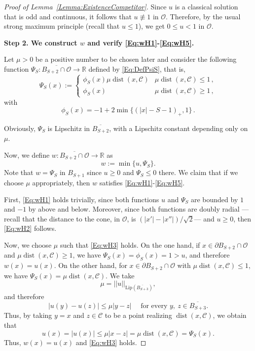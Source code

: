 \documentclass[12pt,reqno]{amsart}
\theoremstyle{definition}
\theoremstyle{remark}
\newcommand{\con}[1]{\mathbb{#1}}
\newcommand{\R}{\con{R}} %
\newcommand{\ccal}{\mathscr{C}}
\newcommand{\ocal}{\mathcal{O}}
\newcommand{\norm}[1]{\left | \left |{#1} \right | \right |}
\DeclareMathOperator{\dist}{dist}
\numberwithin{equation}{section}
\begin{document}
\begin{proof}[Proof of Lemma~\ref{Lemma:ExistenceCompetitor}]
	Since $u$ is a classical solution that is odd and continuous, it follows that $u \not \equiv 1$ in $\ocal$. Therefore, by the usual strong maximum principle (recall that $u\leq 1$), we get $0\leq u < 1$ in $\ocal$. 
	
	\medskip
	
	\textbf{Step 2. We construct $w$ and verify \eqref{Eq:wH1}-\eqref{Eq:wH5}.} 
	
	Let $\mu>0$ be a positive number to be chosen later and consider the following function $\Psi_S:\overline{B_{S+2} \cap \ocal} \to \R$ defined by \eqref{Eq:DefPsiS}, that is, 
	$$
	\Psi_S(x) :=
	\begin{cases}
	\phi_S (x) \mu\dist(x,\ccal) &  \mu\dist(x,\ccal) \leq 1 \,, \\
	\phi_S (x) &  \mu\dist(x,\ccal) \geq 1\,,
	\end{cases}
	$$
	with 
	$$
	\phi_S (x) =-1+2\min\{(|x|-S-1)_+,1\}\,.
	$$
	
	Obviously, $\Psi_S$ is Lipschitz in $\overline{B_{S+2}}$, with a Lipschitz constant depending only on $\mu$.
	
	Now, we define $w:\overline{B_{S+2} \cap \ocal} \to \R$ as
	$$
	w:= \min \{u, \Psi_S\}.
	$$
	Note that $w=\Psi_S$ in $B_{S+1}$ since $u\geq 0$ and $\Psi_S\leq 0$ there.	We claim that if we choose $\mu$ appropriately, then $w$ satisfies \eqref{Eq:wH1}-\eqref{Eq:wH5}. 
	
	First, \eqref{Eq:wH1} holds trivially, since both functions $u$ and $\Psi_S$ are bounded by $1$ and $-1$ by above and below. Moreover, since both functions are doubly radial ---recall that the distance to the cone, in $\ocal$, is $(|x'|-|x''|)/\sqrt{2}$--- and $u\geq0$, then \eqref{Eq:wH2} follows.
	
	Now, we choose $\mu$ such that \eqref{Eq:wH3} holds. On the one hand, if $x\in \partial B_{S+2}\cap \ocal$ and $\mu\dist(x,\ccal) \geq 1$, we have $\Psi_S (x) = \phi_S(x) = 1 > u$, and therefore $w(x) = u(x)$. On the other hand, for $x\in \partial B_{S+2}\cap \ocal$ with $\mu\dist(x,\ccal) \leq 1$, we have $\Psi_S (x) = \mu \dist (x,\ccal)$. We take  
	\begin{equation} 
	\label{Eq:ChoiceMu} 
	\mu = \norm{u}_{\mathrm{Lip}(\overline{B_{S+3}})}, 
	\end{equation} 
	and therefore
	$$ 
	|u(y) - u(z)|\leq \mu |y-z| \quad \text{ for every } y, \ z \in \overline{B_{S+3}}. 
	$$ 
	Thus, by taking $y=x$ and  $z\in \ccal$ to be a point realizing $\dist(x,\ccal)$, we obtain that
	$$ 
	u(x) = |u(x)|\leq \mu |x-z|  = \mu \dist (x,\ccal) = \Psi_S (x).
	$$ 
	Thus, $w(x) = u(x)$ and \eqref{Eq:wH3} holds.
	

\end{proof}
\end{document}
